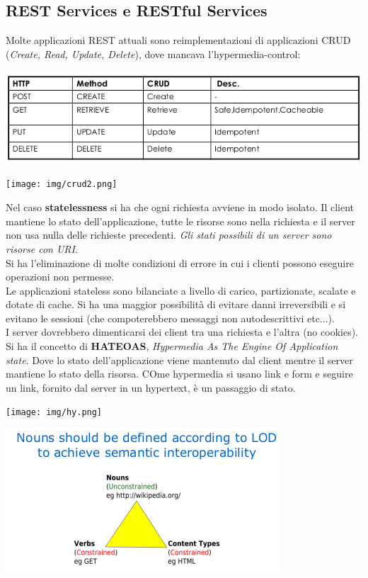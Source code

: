 \documentclass[a4paper,12pt, oneside]{book}
\begin{document}
\subsection{REST Services e RESTful Services}
Molte applicazioni REST attuali sono reimplementazioni di applicazioni CRUD (\textit{Create, Read, Update, Delete}), dove mancava l'hypermedia-control:
\begin{center}
\includegraphics[scale=0.6]{img/crud.png}
\end{center}
\begin{center}
\texttt{[image: img/crud2.png]}
\end{center}
Nel caso \textbf{statelessness} si ha che ogni richiesta avviene in modo isolato.
Il client mantiene lo stato dell'applicazione, tutte le risorse sono nella richiesta
e il server non usa nulla delle richieste precedenti. \textit{Gli stati possibili di un server sono risorse con URI}.\\
Si ha l'eliminazione di molte condizioni di errore in cui i clienti possono eseguire
operazioni non permesse.\\
Le applicazioni stateless sono bilanciate a livello di carico, partizionate, scalate e dotate di cache. Si ha una maggior possibilità di evitare danni irreversibili e si evitano
le sessioni (che compoterebbero messaggi non autodescrittivi etc...).\\
I server dovrebbero dimenticarsi dei client tra una richiesta e l'altra (no cookies).\\
Si ha il concetto di \textbf{HATEOAS}, \textit{Hypermedia As The Engine Of Application state}.
Dove lo stato dell'applicazione viene mantenuto dal client mentre il server mantiene
lo stato della risorsa. COme hypermedia si usano link e form e seguire un link, fornito dal server in un hypertext, è un passaggio di stato.
\begin{center}
\texttt{[image: img/hy.png]}
\end{center}
\begin{center}
\includegraphics[scale=2.3]{img/bho.png}
\end{center}
\end{document}
